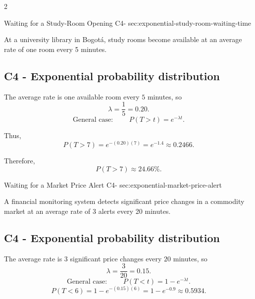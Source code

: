 	\newpage
	\vspace{-4mm}
	\begin{multicols}{2}
		
		\sectionScored
		{Waiting for a Study-Room Opening}
		{C4-}
		{sec:exponential-study-room-waiting-time}
		{
			At a university library in Bogotá, study rooms become available at an
			average rate of one room every 5 minutes.
			
			
			\label{subsec:exponential-study-room-probability}
			\subsection*{C4 - Exponential probability distribution }
			
			The average rate is one available room every \(5\) minutes, so
			\[
			\lambda=\frac{1}{5}=0.20.
			\]
			\[
			\text{General case: } \qquad P(T>t)=e^{-\lambda t}.
			\]
			
			Thus,
			\[
			P(T>7)
			=e^{-(0.20)(7)}
			=e^{-1.4}
			\approx0.2466.
			\]
			
			Therefore,
			\[
			\boxed{P(T>7)\approx24.66\%}.
			\]
			

		}
		
		
		\sectionScored
		{Waiting for a Market Price Alert}
		{C4-}
		{sec:exponential-market-price-alert}
		{
			A financial monitoring system detects significant price changes in a
			commodity market at an average rate of 3 alerts every 20 minutes.
			
			
			\label{subsec:exponential-market-price-alert-probability}
			\subsection*{C4 - Exponential probability distribution }
			\vspace{-3mm}
			The average rate is 3 significant price changes every \(20\) minutes, so
			\[
			\lambda=\frac{3}{20}=0.15.
			\]
			\[
			\text{General case: } \qquad P(T<t)=1-e^{-\lambda t}.
			\]
			\[
			P(T<6)
			=1-e^{-(0.15)(6)}
			=1-e^{-0.9}
			\approx0.5934.
			\]
			
}
\end{multicols}
